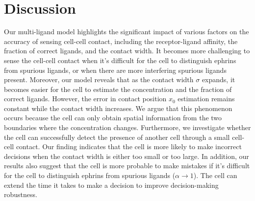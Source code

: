 \section{Discussion}
\label{sec:ch5:discussion}

Our multi-ligand model highlights the significant impact of various factors on the accuracy of sensing cell-cell contact, including the receptor-ligand affinity, the fraction of correct ligands, and the contact width.
It becomes more challenging to sense the cell-cell contact when it's difficult for the cell to distinguish ephrins from spurious ligands, or when there are more interfering spurious ligands present.
Moreover, our model reveals that as the contact width $\sigma$ expands, it becomes easier for the cell to estimate the concentration and the fraction of correct ligands.
However, the error in contact position $x_0$ estimation remains constant while the contact width increases.
We argue that this phenomenon occurs because the cell can only obtain spatial information from the two boundaries where the concentration changes.
Furthermore, we investigate whether the cell can successfully detect the presence of another cell through a small cell-cell contact.
Our finding indicates that the cell is more likely to make incorrect decisions when the contact width is either too small or too large.
In addition, our results also suggest that the cell is more probable to make mistakes if it's difficult for the cell to distinguish ephrins from spurious ligands ($\alpha \to 1$).
The cell can extend the time it takes to make a decision to improve decision-making robustness.

